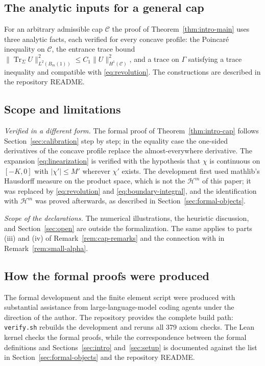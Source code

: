 \documentclass[11pt,a4paper]{article}
\numberwithin{equation}{section}
\theoremstyle{paperplain}
\theoremstyle{remark}
\newcommand{\C}{\mathcal{C}}
\newcommand{\HH}{\mathcal{H}}
\newcommand{\Tr}{\operatorname{Tr}}
\newcommand{\lean}[1]{\texttt{#1}}
\newcommand{\leanaxiomchecks}{379}
\begin{document}
\subsection{The analytic inputs for a general cap}\label{sec:formal-general}
For an arbitrary admissible cap $\C$ the proof of Theorem~\ref{thm:intro-main}
uses three analytic facts, each verified for every concave profile: the
Poincar\'e inequality on $\C$, the entrance trace bound
$\|\Tr_\Sigma U\|^2_{L^2(B_m(1))}\le C_1\|U\|^2_{H^1(\C)}$, and a trace on
$\Gamma$ satisfying a trace inequality and compatible with
\eqref{eq:revolution}. The constructions are described in the repository
README.

\subsection{Scope and limitations}\label{sec:formal-gap}

{}
\emph{Verified in a different form.} The formal proof of
Theorem~\ref{thm:intro-cap} follows Section~\ref{sec:calibration} step by
step; in the equality case the one-sided derivatives of the concave profile
replace the almost-everywhere derivative. The expansion
\eqref{eq:linearization} is verified with the hypothesis that $\chi$ is
continuous on $[-K,0]$ with $|\chi'|\le M'$ wherever $\chi'$ exists. The
development first used mathlib's Hausdorff measure on the product space,
which is not the $\HH^m$ of this paper; it was replaced by
\eqref{eq:revolution} and \eqref{eq:boundary-integral}, and the
identification with $\HH^m$ was proved afterwards, as described in
Section~\ref{sec:formal-objects}.

\emph{Scope of the declarations.} The numerical illustrations, the heuristic
discussion, and Section~\ref{sec:open} are outside the formalization. The
same applies to parts (iii) and (iv) of
Remark~\ref{rem:cap-remarks} and the connection with
\cite[Proposition~3.1]{ACH} in Remark~\ref{rem:small-alpha}.

\subsection{How the formal proofs were produced}
The formal development and the finite element script were produced with
substantial assistance from large-language-model coding agents under the
direction of the author. The
repository provides the complete build path: \lean{verify.sh} rebuilds the
development and reruns all \leanaxiomchecks{} axiom checks. The Lean kernel
checks the formal proofs, while the correspondence between the formal
definitions and Sections~\ref{sec:intro} and~\ref{sec:setup} is documented
against the list in Section~\ref{sec:formal-objects} and the repository
README.
\end{document}
